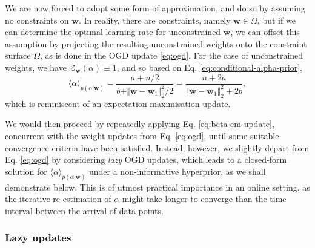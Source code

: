 We are now forced to adopt some form of approximation, and do so by assuming no constraints on $\mathbf{w}$. In reality, there are constraints, namely $\mathbf{w} \in \Omega$, but if we can determine the optimal learning rate for unconstrained $\mathbf{w}$, we can offset this assumption by projecting the resulting unconstrained  weights onto the constraint surface $\Omega$, as is done in the OGD update \eqref{eq:ogd}. For the case of unconstrained weights, we have $\mathcal{Z}_{\mathbf{w}}(\alpha) \equiv 1$, and so based on Eq. \eqref{eq:conditional-alpha-prior},
\begin{equation}
\label{eq:beta-em-update}
	\langle\alpha\rangle_{p(\alpha|\mathbf{w})}
	= \frac{a + n/2}{b + \Vert\mathbf{w}-\mathbf{w}_1\Vert_2^2 / 2}
	= \frac{n + 2a}{\Vert\mathbf{w}-\mathbf{w}_1\Vert_2^2 + 2b},
\end{equation}
which is reminiscent of an expectation-maximisation update.

We would then proceed by repeatedly applying Eq. \eqref{eq:beta-em-update}, concurrent with the weight updates from Eq. \eqref{eq:ogd}, until some suitable convergence criteria have been satisfied. Instead, however, we slightly depart from Eq. \eqref{eq:ogd} by considering \emph{lazy} OGD updates, which leads to a closed-form solution for $\langle\alpha\rangle_{p(\alpha|\mathbf{w})}$ under a non-informative hyperprior, as we shall demonstrate below. This is of utmost practical importance in an online setting, as the iterative re-estimation of $\alpha$ might take longer to converge than the time interval between the arrival of data points.

\subsubsection{Lazy updates} 

